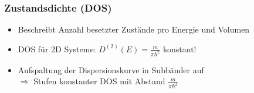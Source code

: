 \documentclass{beamer}
\begin{document}
\begin{frame}
    \frametitle{Zustandsdichte (DOS)}
    \begin{itemize}
        \item Beschreibt Anzahl besetzter Zustände pro Energie und Volumen
        \item DOS für 2D Systeme: 
              $D^{(2)} (E) = \frac{m}{\pi \hbar^2}$ konstant!
        \item Aufspaltung der Dispersionskurve in Subbänder auf\\
              $\Rightarrow$ Stufen konstanter DOS mit Abstand $\frac{m}{\pi\hbar^2}$
    \end{itemize}

\begin{figure}
    \begin{subfigure}[c]{0.6\textwidth}
    \end{subfigure}
\end{figure}
\end{frame}
\end{document}
